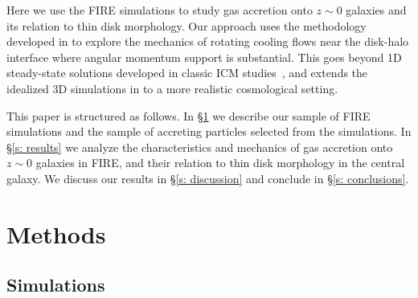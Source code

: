 \documentclass[fleqn,usenatbib]{mnras}
\begin{document}
Here we use the FIRE simulations to study gas accretion onto $z\sim0$ galaxies and its relation to thin disk morphology.
Our approach uses the methodology developed in \citet{Hafen2019,Hafen2020} to  explore the mechanics of rotating cooling flows near the disk-halo interface where angular momentum support is substantial.
This goes beyond 1D steady-state solutions developed in classic ICM studies~\citep[e.g.][]{Cowie1980}, and extends the idealized 3D simulations in \cite{Stern2019} to a more realistic cosmological setting. 

This paper is structured as follows. 
In \S\ref{s: methods} we describe our sample of FIRE simulations and the sample of accreting particles selected from the simulations.
In \S\ref{s: results} we analyze the characteristics and mechanics of gas accretion onto $z\sim0$ galaxies in FIRE, and their relation to thin disk morphology in the central galaxy.
We discuss our results in \S\ref{s: discussion} and conclude in \S\ref{s: conclusions}.

\section{Methods}
\label{s: methods}

\subsection{Simulations}
\label{s: methods -- simulations}
\end{document}
